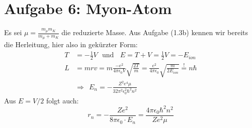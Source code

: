 \documentclass[a4paper,12pt]{article}
\begin{document}
\section*{Aufgabe 6: Myon-Atom}
Es sei $\mu = \frac{m_\mu m_K}{m_\mu + m_K}$ die reduzierte Masse. Aus Aufgabe (1.3b) kennen wir bereits die Herleitung, hier also in gekürzter Form:
\begin{align*}
T&=-\frac{1}{2}V\ \ \ \mathrm{und }\ \ \ \ E=T+V=\frac{1}{2}V=-E_{ion} \\
L&=mrv=m\frac{-e^2}{4\pi\epsilon_0V}\sqrt{\frac{2T}{m}}=\frac{e^2}{4\pi\epsilon_0}\sqrt{\frac{m}{2E_{ion}}}\overset{!}{=}n\hbar \\
&\Rightarrow\ \ E_n=-\frac{Z^2e^4\mu}{32\pi^2\epsilon_0^2\hbar^2n^2}
\end{align*}
Aus $E=V/2$ folgt auch:
$$r_n=-\frac{Ze^2}{8\pi\epsilon_0\cdot E_n}=\frac{4\pi\epsilon_0 \hbar^2n^2}{Ze^2\mu }$$
\end{document}
